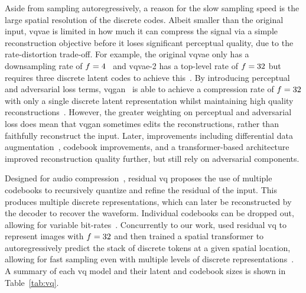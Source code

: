 Aside from sampling autoregressively, a reason for the slow sampling speed is
the large spatial resolution of the discrete codes. Albeit smaller than the
original input, \gls{vqvae} is limited in how much it can compress the signal
via a simple reconstruction objective before it loses significant perceptual
quality, due to the rate-distortion trade-off. For example, the original
\gls{vqvae} only has a downsampling rate of
$f=4$~\cite{oord2017vqvae} and \gls{vqvae}-2 has a top-level rate
of $f=32$ but requires three discrete latent codes to achieve
this~\cite{razavi2019generating}. By introducing perceptual and adversarial loss
terms, \gls{vqgan}~\cite{esser2021taming} is able to achieve a compression rate
of $f=32$ with only a single discrete latent representation
whilst maintaining high quality reconstructions~\cite{esser2021taming}. However,
the greater weighting on perceptual and adversarial loss does mean that
\gls{vqgan} sometimes edits the reconstructions, rather than faithfully
reconstruct the input. Later, improvements including differential data
augmentation~\cite{bondtaylor2021unleashing}, codebook improvements, and a
transformer-based architecture~\cite{yu2021vqgan} improved reconstruction
quality further, but still rely on adversarial components.

Designed for audio compression~\cite{zeghidour2021soundstream},
residual \gls{vq} proposes the use of multiple codebooks to recursively quantize
and refine the residual of the input. This produces multiple discrete
representations, which can later be reconstructed by the decoder to recover
the waveform. Individual codebooks can be dropped out, allowing
for variable bit-rates~\cite{zeghidour2021soundstream}. Concurrently to our
work, \citet{lee2022rqvae} used residual \gls{vq} to represent images with 
$f=32$ and then trained a spatial transformer 
to autoregressively predict the stack of discrete tokens at a given spatial
location, allowing for fast sampling even with multiple levels of discrete
representations~\cite{lee2022rqvae}. A summary of each \gls{vq} model and
their latent and codebook sizes is shown in Table~\ref{tab:vq}.

